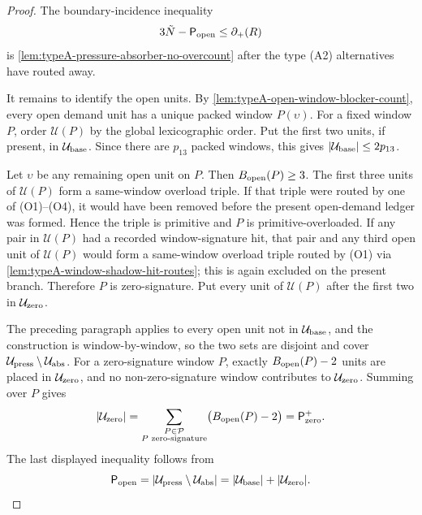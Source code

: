 \documentclass[11pt]{article}
\newcommand{\defp}{\partial_+}
\begin{document}
\begin{proof}
The boundary-incidence inequality
\[
3\tilde N-\mathsf P_{\rm open}\le\defp(R)
\]
is \cref{lem:typeA-pressure-absorber-no-overcount} after the type
\textup{(A2)} alternatives have routed away.

It remains to identify the open units.  By
\cref{lem:typeA-open-window-blocker-count}, every open demand unit has a
unique packed window \(P(\upsilon)\).  For a fixed window \(P\), order
\(\mathcal U(P)\) by the global lexicographic order.  Put the first two units,
if present, in \(\mathcal U_{\rm base}\).  Since there are \(p_{13}\) packed
windows, this gives \(|\mathcal U_{\rm base}|\le2p_{13}\).

Let \(\upsilon\) be any remaining open unit on \(P\).  Then
\(B_{\rm open}(P)\ge3\).  The first three units of \(\mathcal U(P)\) form a
same-window overload triple.  If that triple were routed by one of
\textup{(O1)}--\textup{(O4)}, it would have been removed before the present
open-demand ledger was formed.  Hence the triple is primitive and \(P\) is
primitive-overloaded.  If any pair in \(\mathcal U(P)\) had a recorded
window-signature hit, that pair and any third open unit of \(\mathcal U(P)\) would
form a same-window overload triple routed by \textup{(O1)} via
\cref{lem:typeA-window-shadow-hit-routes}; this is again excluded on the
present branch.  Therefore \(P\) is zero-signature.  Put every unit of
\(\mathcal U(P)\) after the first two in \(\mathcal U_{\rm zero}\).

The preceding paragraph applies to every open unit not in
\(\mathcal U_{\rm base}\), and the construction is window-by-window, so the two
sets are disjoint and cover
\(\mathcal U_{\rm press}\setminus\mathcal U_{\rm abs}\).  For a zero-signature
window \(P\), exactly \(B_{\rm open}(P)-2\) units are placed in
\(\mathcal U_{\rm zero}\), and no non-zero-signature window contributes to
\(\mathcal U_{\rm zero}\).  Summing over \(P\) gives
\[
|\mathcal U_{\rm zero}|
=
\sum_{\substack{P\in\mathcal P\\ P\text{ zero-signature}}}
\bigl(B_{\rm open}(P)-2\bigr)
=
\mathsf P_{\rm zero}^{+}.
\]
The last displayed inequality follows from
\[
\mathsf P_{\rm open}
=|\mathcal U_{\rm press}\setminus\mathcal U_{\rm abs}|
=|\mathcal U_{\rm base}|+|\mathcal U_{\rm zero}|.
\]
\end{proof}
\end{document}
